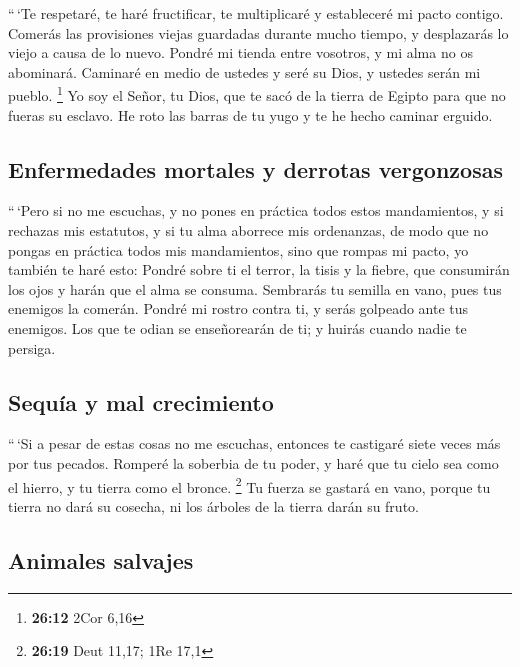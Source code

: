 \begin{paracol}{2}
 ``\,`Te respetaré, te haré fructificar, te multiplicaré y
estableceré mi pacto contigo.  Comerás las provisiones
viejas guardadas durante mucho tiempo, y desplazarás lo viejo a causa de
lo nuevo.  Pondré mi tienda entre vosotros, y mi alma no
os abominará.  Caminaré en medio de ustedes y seré su
Dios, y ustedes serán mi pueblo. \footnote{\textbf{26:12} 2Cor 6,16}
 Yo soy el Señor, tu Dios, que te sacó de la tierra de
Egipto para que no fueras su esclavo. He roto las barras de tu yugo y te
he hecho caminar erguido.

\hypertarget{enfermedades-mortales-y-derrotas-vergonzosas}{%
\subsection{Enfermedades mortales y derrotas
vergonzosas}\label{enfermedades-mortales-y-derrotas-vergonzosas}}

 ``\,`Pero si no me escuchas, y no pones en práctica
todos estos mandamientos,  y si rechazas mis estatutos, y
si tu alma aborrece mis ordenanzas, de modo que no pongas en práctica
todos mis mandamientos, sino que rompas mi pacto,  yo
también te haré esto: Pondré sobre ti el terror, la tisis y la fiebre,
que consumirán los ojos y harán que el alma se consuma. Sembrarás tu
semilla en vano, pues tus enemigos la comerán.  Pondré mi
rostro contra ti, y serás golpeado ante tus enemigos. Los que te odian
se enseñorearán de ti; y huirás cuando nadie te persiga.

\hypertarget{sequuxeda-y-mal-crecimiento}{%
\subsection{Sequía y mal
crecimiento}\label{sequuxeda-y-mal-crecimiento}}

 ``\,`Si a pesar de estas cosas no me escuchas, entonces
te castigaré siete veces más por tus pecados.  Romperé la
soberbia de tu poder, y haré que tu cielo sea como el hierro, y tu
tierra como el bronce. \footnote{\textbf{26:19} Deut 11,17; 1Re 17,1}
 Tu fuerza se gastará en vano, porque tu tierra no dará
su cosecha, ni los árboles de la tierra darán su fruto.

\hypertarget{animales-salvajes}{%
\subsection{Animales salvajes}\label{animales-salvajes}}


\end{paracol}
